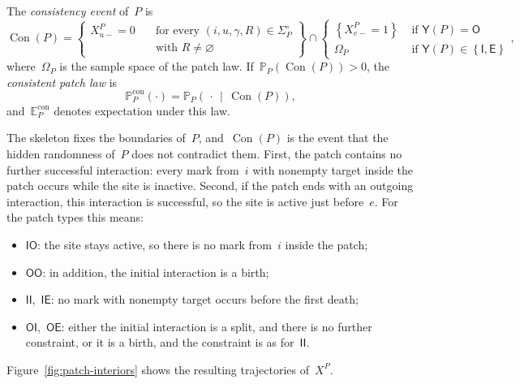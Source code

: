 \documentclass[EJP,preprint,NODS,nobera]{ejpecp}
\newcommand{\pP}{\mathbb{P}}
\newcommand{\E}{\mathbb{E}}
\newcommand{\bb}[1]{\left(#1\right)}
\newcommand{\cb}[1]{\left\{#1\right\}}
\newcommand{\pw}[4]{\left\{\begin{array}{cl}
  #1 &\text{ if } #2 \\
  #3 &\text{ if } #4
\end{array}\right.}
\begin{document}
\begin{definition}
\label{def:consistent-patch-law}
The \emph{consistency event} of~$P$ is
\begin{equation*}
\operatorname{Con}(P)
=
\cb{
\begin{aligned}
X_{u-}^P=0
&\quad\text{for every }(i,u,\gamma,R)\in\Sigma_P^\circ\\[-0.2em]
&\quad\text{with }R\neq\varnothing
\end{aligned}
}
\cap
\pw{\cb{X_{e-}^P=1}}{\mathsf Y(P)=\mathsf O}
{\Omega_P}{\mathsf Y(P)\in\cb{\mathsf I,\mathsf E}},
\end{equation*}
where~$\Omega_P$ is the sample space of the patch law.
If~$\pP_P\bb{\operatorname{Con}(P)}>0$, the \emph{consistent patch law} is
\begin{equation*}
\pP_P^{\mathrm{con}}(\cdot)
=
\pP_P\bb{\,\cdot\,\middle|\,\operatorname{Con}(P)},
\end{equation*}
and~$\E_P^{\mathrm{con}}$ denotes expectation under this law.
\end{definition}

\begin{remark}
\label{rem:consistency}
The skeleton fixes the boundaries of~$P$, and~$\operatorname{Con}(P)$ is the
event that the hidden randomness of~$P$ does not contradict them. First, the
patch contains no further successful interaction: every mark from~$i$ with
nonempty target inside the patch occurs while the site is inactive. Second, if
the patch ends with an outgoing interaction, this interaction is successful,
so the site is active just before~$e$. For the patch types this means:
\begin{itemize}
\item $\mathsf{IO}$: the site stays active, so there is no mark from~$i$
inside the patch;
\item $\mathsf{OO}$: in addition, the initial interaction is a birth;
\item $\mathsf{II}$,~$\mathsf{IE}$: no mark with nonempty target occurs before
the first death;
\item $\mathsf{OI}$,~$\mathsf{OE}$: either the initial interaction is a split,
and there is no further constraint, or it is a birth, and the constraint is as
for~$\mathsf{II}$.
\end{itemize}
Figure~\ref{fig:patch-interiors} shows the resulting trajectories of~$X^P$.
\end{remark}
\end{document}
